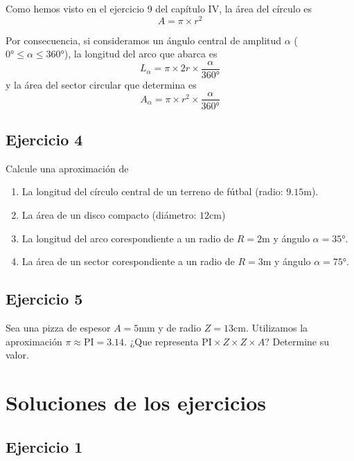 Como hemos visto en el ejercicio 9 del capítulo IV, la área del círculo es
$$
A = \pi \times r^2
$$

Por consecuencia, si consideramos un ángulo central de amplitud $\alpha$
($0° \leq \alpha \leq 360°$), la longitud del arco que abarca es
$$
L_{\alpha} = \pi \times 2r \times \frac{\alpha}{360°}
$$
y la área del sector circular que determina es
$$
A_{\alpha} = \pi \times r^2 \times \frac{\alpha}{360°}
$$

\subsection{Ejercicio 4}

Calcule una aproximación de

\begin{enumerate}
\item La longitud del círculo central de un terreno de fútbal (radio: $9.15$m).
\item La área de un disco compacto (diámetro: $12$cm)
\item La longitud del arco corespondiente a un radio de $R=2$m y ángulo
$\alpha=35$°.
\item La área de un sector corespondiente a un radio de $R=3$m y ángulo
$\alpha=75$°.
\end{enumerate}

\subsection{Ejercicio 5}

Sea una pizza de espesor $A = 5$mm y de radio $Z = 13$cm.
Utilizamos la aproximación $\pi \approx \mathrm{PI} = 3.14$.
¿Que representa $\mathrm{PI} \times Z \times Z \times A$? Determine su valor.

\section{Soluciones de los ejercicios}

\subsection{Ejercicio 1}

